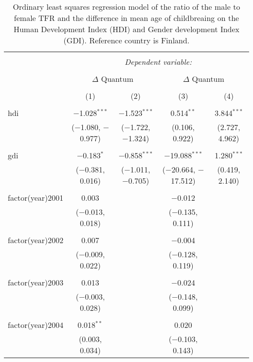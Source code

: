 
\begin{table}[!htbp] \centering 
  \caption{Ordinary least squares regression model of the ratio of the male to female TFR and the difference in mean age of childbreaing on the Human Development Index (HDI) and Gender development Index (GDI). Reference country is Finland.} 
  \label{mod: control} 
\begin{tabular}{@{\extracolsep{5pt}}lcccc} 
\\[-1.8ex]\hline 
\hline \\[-1.8ex] 
 & \multicolumn{4}{c}{\textit{Dependent variable:}} \\ 
\cline{2-5} 
\\[-1.8ex] & \multicolumn{2}{c}{$\Delta$ Quantum} & \multicolumn{2}{c}{$\Delta$ Quantum} \\ 
\\[-1.8ex] & (1) & (2) & (3) & (4)\\ 
\hline \\[-1.8ex] 
 hdi & $-$1.028$^{***}$ & $-$1.523$^{***}$ & 0.514$^{**}$ & 3.844$^{***}$ \\ 
  & ($-$1.080, $-$0.977) & ($-$1.722, $-$1.324) & (0.106, 0.922) & (2.727, 4.962) \\ 
  & & & & \\ 
 gdi & $-$0.183$^{*}$ & $-$0.858$^{***}$ & $-$19.088$^{***}$ & 1.280$^{***}$ \\ 
  & ($-$0.381, 0.016) & ($-$1.011, $-$0.705) & ($-$20.664, $-$17.512) & (0.419, 2.140) \\ 
  & & & & \\ 
 factor(year)2001 & 0.003 &  & $-$0.012 &  \\ 
  & ($-$0.013, 0.018) &  & ($-$0.135, 0.111) &  \\ 
  & & & & \\ 
 factor(year)2002 & 0.007 &  & $-$0.004 &  \\ 
  & ($-$0.009, 0.022) &  & ($-$0.128, 0.119) &  \\ 
  & & & & \\ 
 factor(year)2003 & 0.013 &  & $-$0.024 &  \\ 
  & ($-$0.003, 0.028) &  & ($-$0.148, 0.099) &  \\ 
  & & & & \\ 
 factor(year)2004 & 0.018$^{**}$ &  & 0.020 &  \\ 
  & (0.003, 0.034) &  & ($-$0.103, 0.143) &  \\ 

\end{tabular}
\end{table}
